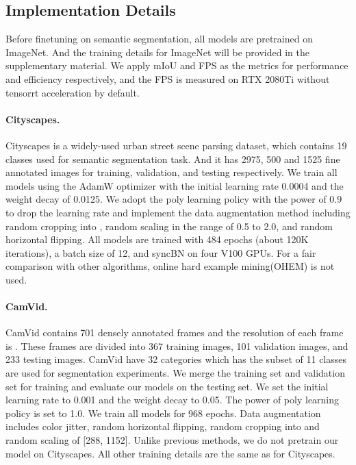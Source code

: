 \documentclass{article}
\begin{document}
\subsection{Implementation Details}
Before finetuning on semantic segmentation, all models are pretrained on ImageNet\cite{deng2009imagenet}. And the training details for ImageNet\cite{deng2009imagenet} will be provided in the supplementary material. We apply mIoU and FPS as the metrics for performance and efficiency respectively, and the FPS is measured on RTX 2080Ti without tensorrt acceleration by default.

\vspace{-2mm}
\paragraph{Cityscapes.}
Cityscapes\cite{Cityscapes} is a widely-used urban street scene parsing dataset, which contains 19 classes used for semantic segmentation task. And it has 2975, 500 and 1525 fine annotated images for training, validation, and testing respectively. We train all models using the AdamW optimizer with the initial learning rate 0.0004 and the weight decay of 0.0125. We adopt the poly learning policy with the power of 0.9 to drop the learning rate and implement the data augmentation method including random cropping into , random scaling in the range of 0.5 to 2.0, and random horizontal flipping. All models are trained with 484 epochs (about 120K iterations), a batch size of 12, and syncBN on four V100 GPUs. For a fair comparison with other algorithms, online hard example mining(OHEM) is not used.

\vspace{-2mm}
\paragraph{CamVid.}
CamVid\cite{CamVid} contains 701 densely annotated frames and the resolution of each frame is . These frames are divided into 367 training images, 101 validation images, and 233 testing images. CamVid\cite{CamVid} have 32 categories which has the subset of 11 classes are used for segmentation experiments.
We merge the training set and validation set for training and evaluate our models on the testing set. We set the initial learning rate to 0.001 and the weight decay to 0.05. The power of poly learning policy is set to 1.0. We train all models for 968 epochs. Data augmentation includes color jitter, random horizontal flipping, random cropping into  and random scaling of [288, 1152]. Unlike previous methods\cite{fan2021rethinking}, we do not pretrain our model on Cityscapes\cite{Cityscapes}. All other training details are the same as for Cityscapes\cite{Cityscapes}.
\end{document}
